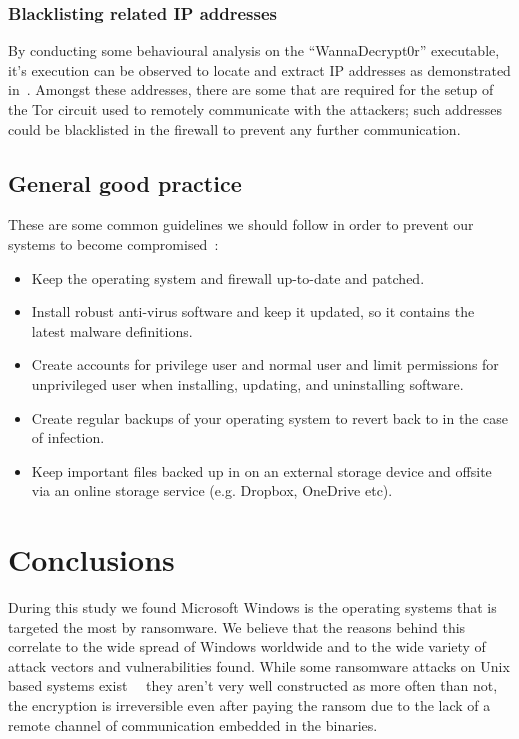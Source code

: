 \documentclass[10pt,a4paper]{article}
\begin{document}
\subsubsection{Blacklisting related IP addresses}
By conducting some behavioural analysis on the ``WannaDecrypt0r'' executable, it's execution can be observed to locate and extract IP addresses as demonstrated in~\cite{wanacryFindIpAddr}. Amongst these addresses, there are some that are required for the setup of the Tor circuit used to remotely communicate with the attackers; such addresses could be blacklisted in the firewall to prevent any further communication.

\subsection{General good practice}
These are some common guidelines we should follow in order to prevent our systems to become compromised~\cite{genernalmitigation}: 
\begin{itemize}
\item Keep the operating system and firewall up-to-date and patched.
\item Install robust anti-virus software and keep it updated, so it contains the latest malware definitions.
\item Create accounts for privilege user and normal user and limit permissions for unprivileged user when installing, updating, and uninstalling software.
\item Create regular backups of your operating system to revert back to in the case of infection.
\item Keep important files backed up in on an external storage device and offsite via an online storage service (e.g. Dropbox, OneDrive etc).
\end{itemize}


\section{Conclusions}
During this study we found Microsoft Windows is the operating systems that is targeted the most by ransomware. We believe that the reasons behind this correlate to the wide spread of Windows worldwide and to the wide variety of attack vectors and vulnerabilities found. While some ransomware attacks on Unix based systems exist~\cite{linuxRansomware}~\cite{osxRansomware} they aren't very well constructed as more often than not, the encryption is irreversible even after paying the ransom due to the lack of a remote channel of communication embedded in the binaries.
\end{document}
